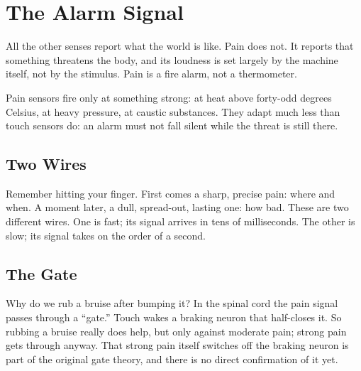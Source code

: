 \chapter{The Alarm Signal}


All the other senses report what the world is like. Pain does not. It reports that something threatens the body, and its loudness is set largely by the machine itself, not by the stimulus. Pain is a fire alarm, not a thermometer.

Pain sensors fire only at something strong: at heat above forty-odd degrees Celsius, at heavy pressure, at caustic substances. They adapt much less than touch sensors do: an alarm must not fall silent while the threat is still there.

\section*{Two Wires}

Remember hitting your finger. First comes a sharp, precise pain: where and when. A moment later, a dull, spread-out, lasting one: how bad. These are two different wires. One is fast; its signal arrives in tens of milliseconds. The other is slow; its signal takes on the order of a second.

\section*{The Gate}

Why do we rub a bruise after bumping it? In the spinal cord the pain signal passes through a ``gate.'' Touch wakes a braking neuron that half-closes it. So rubbing a bruise really does help, but only against moderate pain; strong pain gets through anyway. That strong pain itself switches off the braking neuron is part of the original gate theory, and there is no direct confirmation of it yet.


